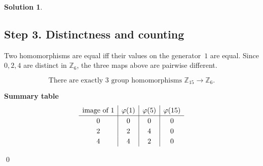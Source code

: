 \documentclass[12pt]{article}
\theoremstyle{definition} %
\newtheorem{solution}{Solution}
\theoremstyle{plain} %
\begin{document}
\begin{solution}
          \subsection*{Step 3.  Distinctness and counting}
          
          Two homomorphisms are equal iff their values on the generator~$1$ are
          equal.  Since $0,2,4$ are distinct in $\mathbb{Z}_{6}$, the three maps above are
          pairwise different.
          
          \[
             \boxed{\text{There are exactly $3$ group homomorphisms } \mathbb{Z}_{15}\to\mathbb{Z}_{6}.}
          \]
          
          \bigskip
          \noindent
          \textbf{Summary table}
          \[
          \renewcommand{\arraystretch}{1.2}
          \begin{array}{c|c|c|c}
          \text{image of $1$} & \varphi(1) & \varphi(5) & \varphi(15)\rule[-4pt]{0pt}{14pt}\\\hline
          0 & 0 & 0 & 0\\
          2 & 2 & 4 & 0\\
          4 & 4 & 2 & 0
          \end{array}
          \]
          
          \qed
          \end{solution}
\end{document}
